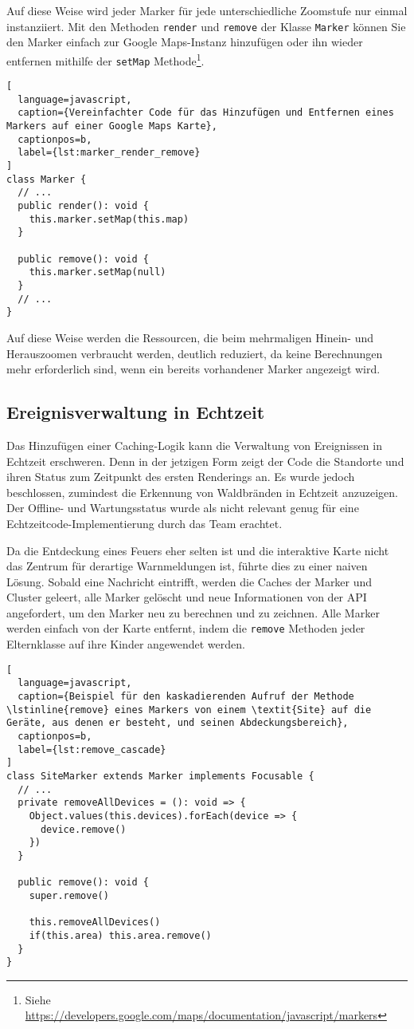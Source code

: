 Auf diese Weise wird jeder Marker für jede unterschiedliche Zoomstufe nur einmal instanziiert.
Mit den Methoden \lstinline{render} und \lstinline{remove} der Klasse \lstinline{Marker} können Sie den Marker einfach zur Google Maps-Instanz hinzufügen oder ihn wieder entfernen mithilfe der \lstinline{setMap} Methode\footnote{Siehe \href{https://developers.google.com/maps/documentation/javascript/markers}{https://developers.google.com/maps/documentation/javascript/markers}}.

\begin{lstlisting}[
  language=javascript,
  caption={Vereinfachter Code für das Hinzufügen und Entfernen eines Markers auf einer Google Maps Karte},
  captionpos=b,
  label={lst:marker_render_remove}
]
class Marker {
  // ...
  public render(): void {
    this.marker.setMap(this.map)
  }

  public remove(): void {
    this.marker.setMap(null)
  }
  // ...
}
\end{lstlisting}

Auf diese Weise werden die Ressourcen, die beim mehrmaligen Hinein- und Herauszoomen verbraucht werden, deutlich reduziert, da keine Berechnungen mehr erforderlich sind, wenn ein bereits vorhandener Marker angezeigt wird.

\subsection{Ereignisverwaltung in Echtzeit}

Das Hinzufügen einer Caching-Logik kann die Verwaltung von Ereignissen in Echtzeit erschweren.
Denn in der jetzigen Form zeigt der Code die Standorte und ihren Status zum Zeitpunkt des ersten Renderings an.
Es wurde jedoch beschlossen, zumindest die Erkennung von Waldbränden in Echtzeit anzuzeigen.
Der Offline- und Wartungsstatus wurde als nicht relevant genug für eine Echtzeitcode-Implementierung durch das Team erachtet.

Da die Entdeckung eines Feuers eher selten ist und die interaktive Karte nicht das Zentrum für derartige Warnmeldungen ist, führte dies zu einer naiven Lösung.
Sobald eine Nachricht eintrifft, werden die Caches der Marker und Cluster geleert, alle Marker gelöscht und neue Informationen von der \ac{API} angefordert, um den Marker neu zu berechnen und zu zeichnen.
Alle Marker werden einfach von der Karte entfernt, indem die \lstinline{remove} Methoden jeder Elternklasse auf ihre Kinder angewendet werden.

\begin{lstlisting}[
  language=javascript,
  caption={Beispiel für den kaskadierenden Aufruf der Methode \lstinline{remove} eines Markers von einem \textit{Site} auf die Geräte, aus denen er besteht, und seinen Abdeckungsbereich},
  captionpos=b,
  label={lst:remove_cascade}
]
class SiteMarker extends Marker implements Focusable {
  // ...
  private removeAllDevices = (): void => {
    Object.values(this.devices).forEach(device => {
      device.remove()
    })
  }

  public remove(): void {
    super.remove()

    this.removeAllDevices()
    if(this.area) this.area.remove()
  }
}
\end{lstlisting}


